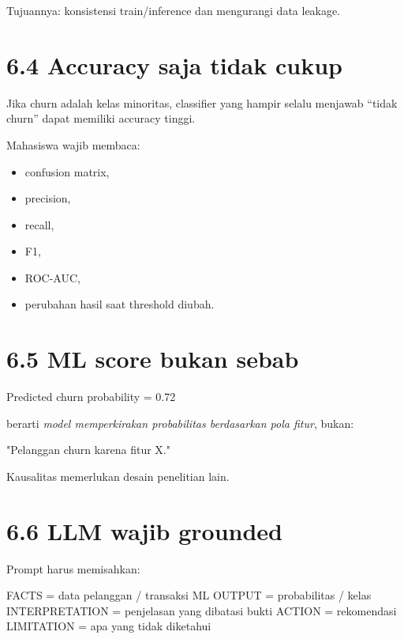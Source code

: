 \documentclass[
  indonesian,
  letterpaper,
  DIV=11,
  numbers=noendperiod]{scrreprt}
\newenvironment{Shaded}{\begin{snugshade}}{\end{snugshade}}
\newcommand{\NormalTok}[1]{\textcolor[rgb]{0.00,0.23,0.31}{#1}}
\providecommand{\tightlist}{%
  \setlength{\itemsep}{0pt}\setlength{\parskip}{0pt}}
\begin{document}
Tujuannya: konsistensi train/inference dan mengurangi data leakage.

\section{6.4 Accuracy saja tidak cukup}\label{accuracy-saja-tidak-cukup}

Jika churn adalah kelas minoritas, classifier yang hampir selalu
menjawab ``tidak churn'' dapat memiliki accuracy tinggi.

Mahasiswa wajib membaca:

\begin{itemize}
\tightlist
\item
  confusion matrix,
\item
  precision,
\item
  recall,
\item
  F1,
\item
  ROC-AUC,
\item
  perubahan hasil saat threshold diubah.
\end{itemize}

\section{6.5 ML score bukan sebab}\label{ml-score-bukan-sebab}

\begin{Shaded}
\begin{Highlighting}[]
\NormalTok{Predicted churn probability = 0.72}
\end{Highlighting}
\end{Shaded}

berarti \emph{model memperkirakan probabilitas berdasarkan pola fitur},
bukan:

\begin{Shaded}
\begin{Highlighting}[]
\NormalTok{"Pelanggan churn karena fitur X."}
\end{Highlighting}
\end{Shaded}

Kausalitas memerlukan desain penelitian lain.

\section{6.6 LLM wajib grounded}\label{llm-wajib-grounded}

Prompt harus memisahkan:

\begin{Shaded}
\begin{Highlighting}[]
\NormalTok{FACTS        = data pelanggan / transaksi}
\NormalTok{ML OUTPUT    = probabilitas / kelas}
\NormalTok{INTERPRETATION = penjelasan yang dibatasi bukti}
\NormalTok{ACTION       = rekomendasi}
\NormalTok{LIMITATION   = apa yang tidak diketahui}
\end{Highlighting}
\end{Shaded}
\end{document}
